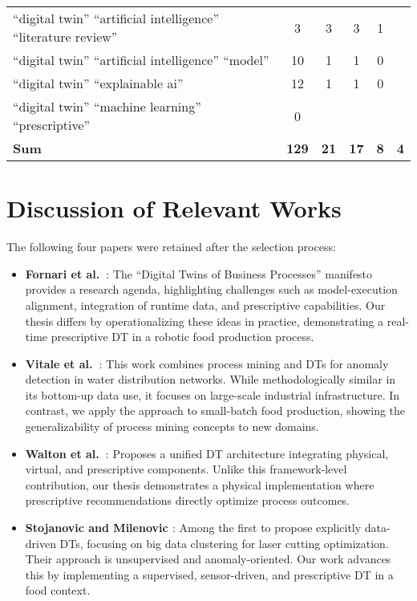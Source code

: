 \begin{table}[h!]
\begin{center}
\begin{tabular}{l|c|c|c|c|c}
      ``digital twin'' ``artificial intelligence'' ``literature review'' & 3 & 3 & 3 & 1 &   \\
      ``digital twin'' ``artificial intelligence'' ``model''      & 10 & 1 & 1 & 0 &   \\
      ``digital twin'' ``explainable ai''                         & 12 & 1 & 1 & 0 &   \\
      ``digital twin'' ``machine learning'' ``prescriptive''      & 0  &   &   &   &   \\
      \hline
      \textbf{Sum}                                                & \textbf{129} & \textbf{21} & \textbf{17} & \textbf{8} & \textbf{4} \\
    \end{tabular}
  \end{center}
\end{table}

\section*{Discussion of Relevant Works}
The following four papers were retained after the selection process:

\begin{itemize}
  \item \textbf{Fornari et al.\ \cite{FORNARI2025101477}}: The ``Digital Twins of Business Processes'' manifesto provides a research agenda, highlighting challenges such as model-execution alignment, integration of runtime data, and prescriptive capabilities. Our thesis differs by operationalizing these ideas in practice, demonstrating a real-time prescriptive DT in a robotic food production process.
  \item \textbf{Vitale et al.\ \cite{10716255}}: This work combines process mining and DTs for anomaly detection in water distribution networks. While methodologically similar in its bottom-up data use, it focuses on large-scale industrial infrastructure. In contrast, we apply the approach to small-batch food production, showing the generalizability of process mining concepts to new domains.
  \item \textbf{Walton et al.\ \cite{WALTON2024110241}}: Proposes a unified DT architecture integrating physical, virtual, and prescriptive components. Unlike this framework-level contribution, our thesis demonstrates a physical implementation where prescriptive recommendations directly optimize process outcomes.
  \item \textbf{Stojanovic and Milenovic \cite{8622412}}: Among the first to propose explicitly data-driven DTs, focusing on big data clustering for laser cutting optimization. Their approach is unsupervised and anomaly-oriented. Our work advances this by implementing a supervised, sensor-driven, and prescriptive DT in a food context.
\end{itemize}

